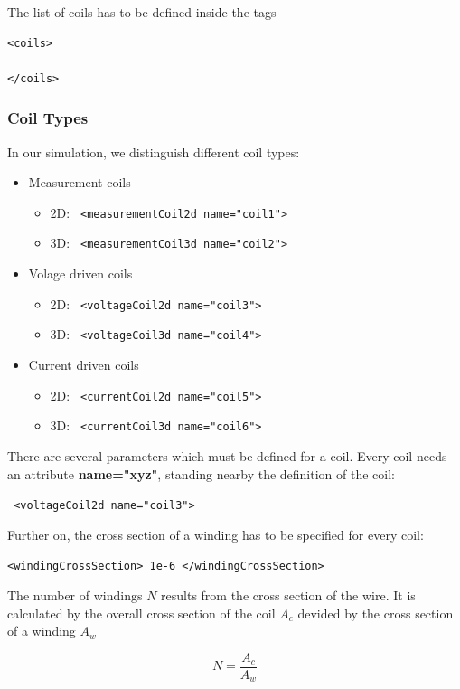 The list of coils has to be defined inside the tags

\begin{verbatim}
<coils>

</coils>
\end{verbatim}

\subsubsection{Coil Types}

In our simulation, we distinguish different coil types:
\begin{itemize}
\item Measurement coils
  \begin{itemize}
  \item 2D: \verb! <measurementCoil2d name="coil1">!
  \item 3D: \verb! <measurementCoil3d name="coil2">!
  \end{itemize}
\item Volage driven coils 
  \begin{itemize}
  \item 2D: \verb! <voltageCoil2d name="coil3">!
  \item 3D: \verb! <voltageCoil3d name="coil4">!
  \end{itemize}
\item Current driven coils 
  \begin{itemize}
  \item 2D: \verb! <currentCoil2d name="coil5">!
  \item 3D: \verb! <currentCoil3d name="coil6">!
  \end{itemize}
\end{itemize}

There are several parameters which must be defined for a coil. Every
coil needs an attribute {\bf name="xyz"}, standing nearby the
definition of the coil:

\verb! <voltageCoil2d name="coil3">!

\noindent
Further on, the cross section of a winding has to be
specified for every coil:

\verb!<windingCrossSection> 1e-6 </windingCrossSection>!

\noindent
The number of windings $N$ results from the cross section of the wire. It
is calculated by the overall cross section of the coil $A_c$ devided
by the cross section of a winding $A_w$

\begin{equation}
  \label{eq:N}
  N=\frac{A_c}{A_w}
\end{equation}

